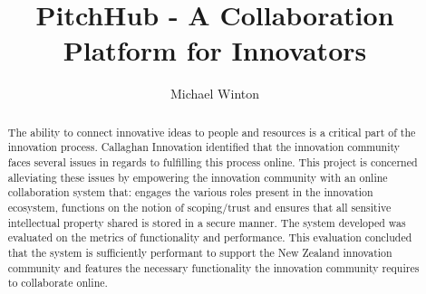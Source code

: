 \documentclass[11pt
              , a4paper
              , twoside
              , openright
              ]{report}
\title{PitchHub - A Collaboration Platform for Innovators}
\author{Michael Winton}
\date{}
\begin{document}
\frontmatter



\begin{abstract}

The ability to connect innovative ideas to people and resources is a critical part of the innovation process. Callaghan Innovation identified that the innovation community faces several issues in regards to fulfilling this process online. This project is concerned alleviating these issues by empowering the innovation community with an online collaboration system that: engages the various roles present in the innovation ecosystem, functions on the notion of scoping/trust and ensures that all sensitive intellectual property shared is stored in a secure manner. The system developed was evaluated on the metrics of functionality and performance. This evaluation concluded that the system is sufficiently performant to support the New Zealand innovation community and features the necessary functionality the innovation community requires to collaborate online.

\end{abstract}


\maketitle

% 

\tableofcontents



\mainmatter














% 
% 


\backmatter





\end{document}
